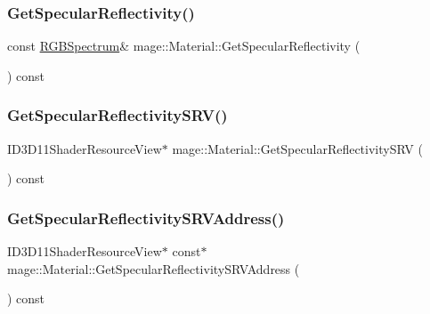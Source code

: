 \hypertarget{structmage_1_1_material_a81005b5094b99b9a8d7f16bedd195718}{}\label{structmage_1_1_material_a81005b5094b99b9a8d7f16bedd195718} 
\subsubsection{\texorpdfstring{Get\+Specular\+Reflectivity()}{GetSpecularReflectivity()}\hspace{0.1cm}{\footnotesize\ttfamily [2/2]}}
{\footnotesize\ttfamily const \hyperlink{structmage_1_1_r_g_b_spectrum}{R\+G\+B\+Spectrum}\& mage\+::\+Material\+::\+Get\+Specular\+Reflectivity (\begin{DoxyParamCaption}{ }\end{DoxyParamCaption}) const\hspace{0.3cm}{\ttfamily [noexcept]}}

\hypertarget{structmage_1_1_material_a04fad2f985ed5078a8217ebcfd51c3f0}{}\label{structmage_1_1_material_a04fad2f985ed5078a8217ebcfd51c3f0} 
\subsubsection{\texorpdfstring{Get\+Specular\+Reflectivity\+S\+R\+V()}{GetSpecularReflectivitySRV()}}
{\footnotesize\ttfamily I\+D3\+D11\+Shader\+Resource\+View$\ast$ mage\+::\+Material\+::\+Get\+Specular\+Reflectivity\+S\+RV (\begin{DoxyParamCaption}{ }\end{DoxyParamCaption}) const\hspace{0.3cm}{\ttfamily [noexcept]}}

\hypertarget{structmage_1_1_material_a7c3ea6461982e7dc9a60a391d601f172}{}\label{structmage_1_1_material_a7c3ea6461982e7dc9a60a391d601f172} 
\subsubsection{\texorpdfstring{Get\+Specular\+Reflectivity\+S\+R\+V\+Address()}{GetSpecularReflectivitySRVAddress()}}
{\footnotesize\ttfamily I\+D3\+D11\+Shader\+Resource\+View$\ast$ const$\ast$ mage\+::\+Material\+::\+Get\+Specular\+Reflectivity\+S\+R\+V\+Address (\begin{DoxyParamCaption}{ }\end{DoxyParamCaption}) const\hspace{0.3cm}{\ttfamily [noexcept]}}

